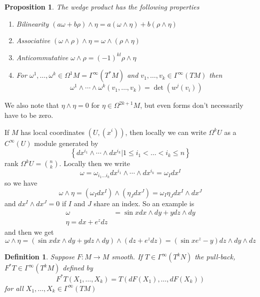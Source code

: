 \documentclass[a4paper]{article}
\newtheorem*{prop}{Proposition}
\newtheorem*{defn}{Definition}
\begin{document}
\begin{prop}
  The wedge product has the following properties
  \begin{enumerate}
    \item Bilinearity $(a \omega + b \rho) \wedge \eta = a(\omega \wedge \eta) + b (\rho \wedge \eta)$
    \item Associative $(\omega \wedge \rho) \wedge \eta = \omega \wedge (\rho \wedge \eta)$
    \item Anticommutative $\omega \wedge \rho = (-1)^{kl} \rho \wedge \eta$
    \item For $\omega^1, \dots, \omega^k \in \Omega^1M = \Gamma^\infty (T^*M)$ and $v_1,\dots,v_k \in \Gamma^\infty(TM)$ then
      \[
        \omega^1 \wedge \cdots \wedge \omega^k(v_1, \dots, v_k) = \det(w^j(v_i))
      \]
  \end{enumerate}
\end{prop}
We also note that $\eta \wedge \eta = 0$ for $\eta \in \Omega^{2k+1}M$, but even forms don't necessarily have to be zero.

If $M$ has local coordinates $(U,(x^i))$, then locally we can write $\Omega^kU$ as a $C^\infty(U)$ module generated by 
\[
  \left\{ dx^{i_1} \wedge \cdots \wedge dx^{i_k} | 1 \leq i_1 < \dots < i_k \leq n\right\}
\]
rank $\Omega^k U = \binom{n}{k}$. Locally then we write
\[
  \omega = \omega_{i_1 \dots i_k} dx^{i_1} \wedge \cdots \wedge dx^{i_k} = \omega_I dx^I
\]
so we have
\[
  \omega \wedge  \eta = (\omega_I dx^I) \wedge (\eta_J dx^J) = \omega_I \eta_J dx^I \wedge dx^J
\]
and $dx^I \wedge dx^J = 0$ if $I$ and $J$ share an index. So an example is
\[
  \begin{aligned}
    \omega &= \sin x dx \wedge dy + y dz \wedge dy \\
    \eta = dx + e^z dz
  \end{aligned}
\]
and then we get
\[
  \omega \wedge \eta = (\sin x dx \wedge dy + y dz \wedge dy) \wedge (dz + e^zdz) = (\sin x e^z - y) dz \wedge dy \wedge dz
\]

\begin{defn}
  Suppose $F: M \rightarrow M$ smooth. If $T \in \Gamma^\infty(T^kN)$ the pull-back, $F^* T \in \Gamma^\infty(T^kM)$ defined by 
  \[
    F^*T(X_1, \dots, X_k) = T(dF(X_1), \dots, dF(X_k))
  \]
  for all $X_1, \dots, X_k \in \Gamma^\infty(TM)$
\end{defn}
\end{document}
